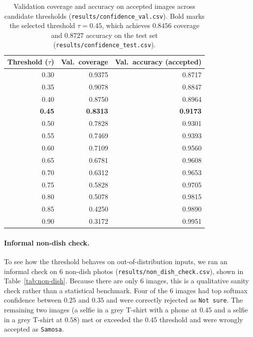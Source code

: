 \begin{table}[H]
  \centering
  \small
  \begin{tabular}{|r|r|r|}
    \hline
    \textbf{Threshold ($\tau$)} & \textbf{Val.\ coverage} & \textbf{Val.\ accuracy (accepted)} \\
    \hline
    0.30 & 0.9375 & 0.8717 \\
    0.35 & 0.9078 & 0.8847 \\
    0.40 & 0.8750 & 0.8964 \\
    \textbf{0.45} & \textbf{0.8313} & \textbf{0.9173} \\
    0.50 & 0.7828 & 0.9301 \\
    0.55 & 0.7469 & 0.9393 \\
    0.60 & 0.7109 & 0.9560 \\
    0.65 & 0.6781 & 0.9608 \\
    0.70 & 0.6312 & 0.9653 \\
    0.75 & 0.5828 & 0.9705 \\
    0.80 & 0.5078 & 0.9815 \\
    0.85 & 0.4250 & 0.9890 \\
    0.90 & 0.3172 & 0.9951 \\
    \hline
  \end{tabular}
  \caption{Validation coverage and accuracy on accepted images across candidate
  thresholds (\texttt{results/confidence\_val.csv}). Bold marks the selected
  threshold $\tau = 0.45$, which achieves $0.8456$ coverage and $0.8727$
  accuracy on the test set (\texttt{results/confidence\_test.csv}).}
  \label{tab:confidence-val}
\end{table}

\paragraph{Informal non-dish check.}
To see how the threshold behaves on out-of-distribution inputs, we ran an
informal check on 6 non-dish photos (\texttt{results/non\_dish\_check.csv}),
shown in Table~\ref{tab:non-dish}. Because there are only 6 images, this is a
qualitative sanity check rather than a statistical benchmark. Four of the 6
images had top softmax confidence between $0.25$ and $0.35$ and were correctly
rejected as \texttt{Not sure}. The remaining two images (a selfie in a grey
T-shirt with a phone at $0.45$ and a selfie in a grey T-shirt at $0.58$) met or
exceeded the $0.45$ threshold and were wrongly accepted as \texttt{Samosa}.

